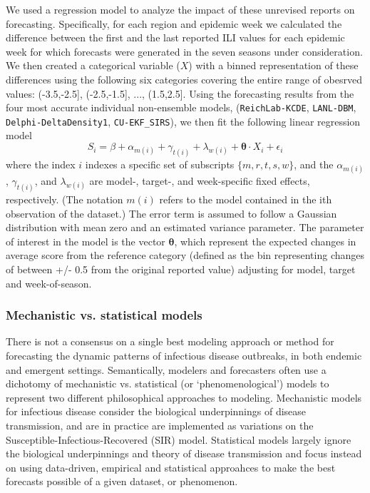 \documentclass{article}
\begin{document}
We used a regression model to analyze the impact of these unrevised reports on forecasting.
Specifically, for each region and epidemic week we calculated the difference between the first and the last reported ILI values for each epidemic week for which forecasts were generated in the seven seasons under consideration.
We then created a categorical variable ($X$) with a binned representation of these differences using the following six categories covering the entire range of obesrved values: (-3.5,-2.5], (-2.5,-1.5], ..., (1.5,2.5].
Using the forecasting results from the four most accurate individual non-ensemble models, ({\tt ReichLab-KCDE}, {\tt LANL-DBM}, {\tt Delphi-DeltaDensity1}, {\tt CU-EKF\_SIRS}), we then fit the following linear regression model
\begin{equation}
S_i = \beta + \alpha_{m(i)} + \gamma_{t(i)} + \lambda_{w(i)} + {\mathbf \theta}\cdot X_i + \epsilon_i
\end{equation}
where the index $i$ indexes a specific set of subscripts $\{m,r,t,s,w\}$, and the $\alpha_{m(i)}$, $\gamma_{t(i)}$, and $\lambda_{w(i)}$ are model-, target-, and week-specific fixed effects, respectively. (The notation $m(i)$ refers to the model contained in the ith observation of the dataset.) The error term is assumed to follow a Gaussian distribution with mean zero and an estimated variance parameter. The parameter of interest in the model is the vector ${\mathbf \theta}$, which represent the expected changes in average score from the reference category (defined as the bin representing changes of between +/- 0.5 from the original reported value) adjusting for model, target and week-of-season.

\subsubsection*{Mechanistic vs. statistical models}

There is not a consensus on a single best modeling approach or method for forecasting the dynamic patterns of infectious disease outbreaks, in both endemic and emergent settings. 
Semantically, modelers and forecasters often use a dichotomy of mechanistic vs. statistical (or `phenomenological') models to represent two different philosophical approaches to modeling.
Mechanistic models for infectious disease consider the biological underpinnings of disease transmission, and are in practice are implemented as variations on the Susceptible-Infectious-Recovered (SIR) model. 
Statistical models largely ignore the biological underpinnings and theory of disease transmission and focus instead on using data-driven, empirical and statistical approahces to make the best forecasts possible of a given dataset, or phenomenon. 
\end{document}
